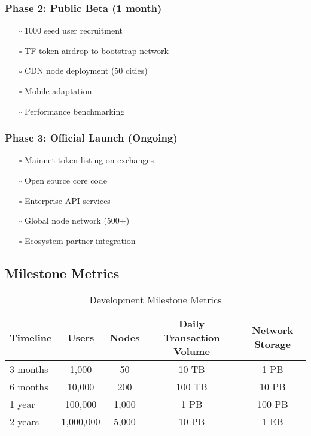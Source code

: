 \documentclass[12pt,a4paper]{article}
\begin{document}
\subsubsection{Phase 2: Public Beta (1 month)}
\begin{itemize}
    \item[$\square$] 1000 seed user recruitment
    \item[$\square$] TF token airdrop to bootstrap network
    \item[$\square$] CDN node deployment (50 cities)
    \item[$\square$] Mobile adaptation
    \item[$\square$] Performance benchmarking
\end{itemize}

\subsubsection{Phase 3: Official Launch (Ongoing)}
\begin{itemize}
    \item[$\square$] Mainnet token listing on exchanges
    \item[$\square$] Open source core code
    \item[$\square$] Enterprise API services
    \item[$\square$] Global node network (500+)
    \item[$\square$] Ecosystem partner integration
\end{itemize}

\subsection{Milestone Metrics}

\begin{table}[htbp]
\centering
\begin{tabular}{|l|c|c|c|c|}
\hline
\textbf{Timeline} & \textbf{Users} & \textbf{Nodes} & \textbf{Daily Transaction Volume} & \textbf{Network Storage} \\
\hline
3 months & 1,000 & 50 & 10 TB & 1 PB \\
\hline
6 months & 10,000 & 200 & 100 TB & 10 PB \\
\hline
1 year & 100,000 & 1,000 & 1 PB & 100 PB \\
\hline
2 years & 1,000,000 & 5,000 & 10 PB & 1 EB \\
\hline
\end{tabular}
\caption{Development Milestone Metrics}
\end{table}
\end{document}
